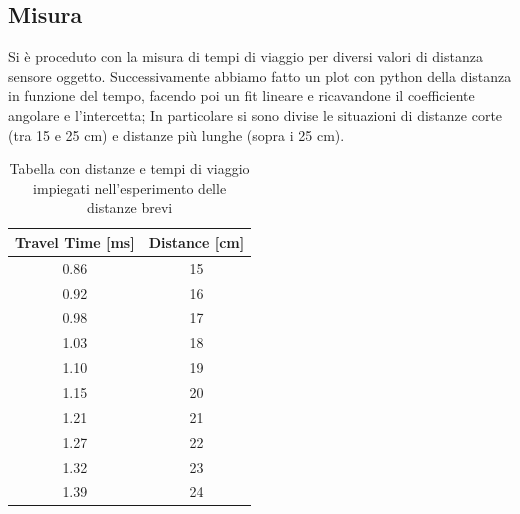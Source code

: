 \documentclass[10pt, a4paper, italian]{article}
\begin{document}
\subsection{Misura}
Si è proceduto con la misura di tempi di viaggio per diversi valori di distanza sensore oggetto. Successivamente abbiamo fatto un plot con python della distanza in funzione del tempo, facendo poi un fit lineare e ricavandone il coefficiente angolare e l'intercetta; In particolare si sono divise le situazioni di distanze corte (tra 15 e 25 cm) e distanze più lunghe (sopra i 25 cm).
\begin{table}[htbp]
\centering
\begin{tabular}{cc}
\toprule
Travel Time [ms] & Distance [cm] \\
\midrule
\midrule
0.86 & 15   \\
0.92 & 16   \\
0.98 & 17   \\
1.03 & 18  \\
1.10 & 19   \\
1.15 & 20   \\
1.21 & 21   \\
1.27 & 22   \\
1.32 & 23  \\
1.39 & 24 \\
\bottomrule
\end{tabular}
\caption{Tabella con distanze e tempi di viaggio impiegati nell'esperimento delle distanze brevi}
\end{table}
\end{document}
